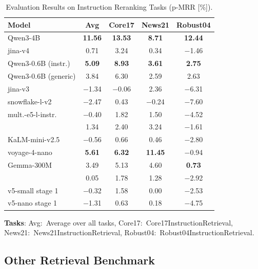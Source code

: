 \documentclass[11pt]{article}
\begin{document}
\begin{table}[H]
\caption{Evaluation Results on Instruction Reranking Tasks (p-MRR [\%]).}
\label{tab:instruction_reranking}
\centering
\small
\setlength{\tabcolsep}{4pt}
\begin{tabular}{l*{4}{c}}
\toprule
\textbf{Model} & \textbf{Avg} & \textbf{Core17} & \textbf{News21} & \textbf{Robust04} \\
\midrule
Qwen3-4B & \textbf{11.56} & \textbf{13.53} & \textbf{8.71} & \textbf{12.44} \\
jina-v4 & 0.71 & 3.24 & 0.34 & $-$1.46 \\
\midrule
Qwen3-0.6B (instr.) & \textbf{5.09} & \textbf{8.93} & \textbf{3.61} & \textbf{2.75} \\
Qwen3-0.6B (generic) & 3.84 & 6.30 & 2.59 & 2.63 \\
jina-v3 & $-$1.34 & $-$0.06 & 2.36 & $-$6.31 \\
snowflake-l-v2 & $-$2.47 & 0.43 & $-$0.24 & $-$7.60 \\
mult.-e5-l-instr. & $-$0.40 & 1.82 & 1.50 & $-$4.52 \\
\JEmbeddingVFiveTextSmallShort{} & 1.34 & 2.40 & 3.24 & $-$1.61 \\
\midrule
KaLM-mini-v2.5 & $-$0.56 & 0.66 & 0.46 & $-$2.80 \\
voyage-4-nano & \textbf{5.61} & \textbf{6.32} & \textbf{11.45} & $-$0.94 \\
Gemma-300M & 3.49 & 5.13 & 4.60 & \textbf{0.73} \\
\JEmbeddingVFiveTextNanoShort{} & 0.05 & 1.78 & 1.28 & $-$2.92 \\
\midrule
v5-small stage 1 & $-$0.32 & 1.58 & 0.00 & $-$2.53 \\
v5-nano stage 1 & $-$1.31 & 0.63 & 0.18 & $-$4.75 \\
\bottomrule
\end{tabular}
\begin{flushleft}
\textbf{Tasks}: Avg:~Average over all tasks, Core17:~Core17InstructionRetrieval, News21:~News21InstructionRetrieval, Robust04:~Robust04InstructionRetrieval.
\end{flushleft}
\end{table}

\subsection{Other Retrieval Benchmark}
\label{app:retrieval-benchmarks}
\end{document}
